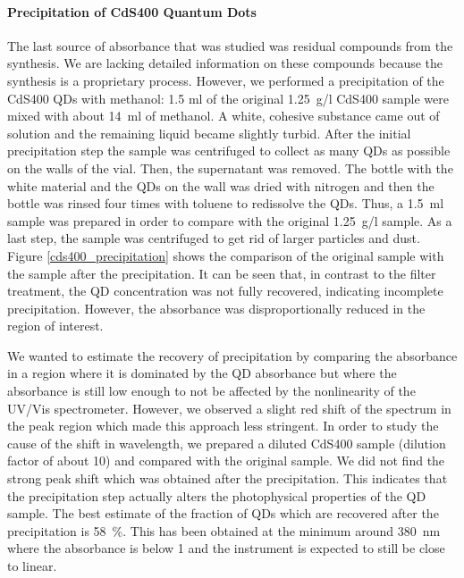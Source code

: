 \documentclass[cits]{JINST}
\begin{document}
\paragraph{Precipitation of CdS400 Quantum Dots}
\label{precipitation_subsection} 
The last source of absorbance that was studied was residual compounds from the synthesis. We are lacking detailed information on these compounds because the synthesis is a proprietary process. However, we performed a precipitation of the CdS400 QDs with methanol: 1.5 ml of the original 1.25~g/l CdS400 sample were mixed with about 14~ml of methanol. A white, cohesive substance came out of solution and the remaining liquid became slightly turbid. After the initial precipitation step the sample was centrifuged to collect as many QDs as possible on the walls of the vial. Then, the supernatant was removed. The bottle with the white material and the QDs on the wall was dried with nitrogen and then the bottle was rinsed four times with toluene to redissolve the QDs. Thus, a 1.5~ml sample was prepared in order to compare with the original 1.25~g/l sample. As a last step, the sample was centrifuged to get rid of larger particles and dust. Figure \ref{cds400_precipitation} shows the comparison of the original sample with the sample after the precipitation. It can be seen that, in contrast to the filter treatment, the QD concentration was not fully recovered, indicating incomplete precipitation. However, the absorbance was disproportionally reduced in the region of interest. 

We wanted to estimate the recovery of precipitation by comparing the absorbance in a region where it is dominated by the QD absorbance but where the absorbance is still low enough to not be affected by the nonlinearity of the UV/Vis spectrometer. However, we observed a slight red shift of the spectrum in the peak region which made this approach less stringent. In order to study the cause of the shift in wavelength, we prepared a diluted CdS400 sample (dilution factor of about 10) and compared with the original sample. We did not find the strong peak shift which was obtained after the precipitation. This indicates that the precipitation step actually alters the photophysical properties of the QD sample. The best estimate of the fraction of QDs which are recovered after the precipitation is 58~\%. This has been obtained at the minimum around 380~nm where the absorbance is below 1 and the instrument is expected to still be close to linear. 
\end{document}

